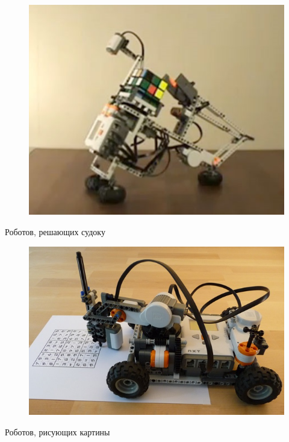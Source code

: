 \begin{figure}[h!]
	\begin{center}
		\includegraphics[width=0.83\linewidth]{chapters/chapter30/images/1}
		\caption{}
		\label{ris:image30x1}
	\end{center}
\end{figure}

Роботов, решающих судоку

\begin{figure}[h!]
	\begin{center}
		\includegraphics[width=0.83\linewidth]{chapters/chapter30/images/2}
		\caption{}
		\label{ris:image30x2}
	\end{center}
\end{figure}

Роботов, рисующих картины

